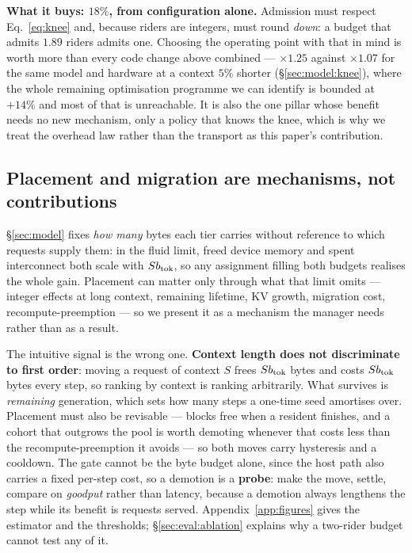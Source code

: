 \textbf{What it buys: $18\%$, from configuration alone.} Admission must respect
Eq.~\ref{eq:knee} and, because riders are integers, must round \emph{down}: a
budget that admits $1.89$ riders admits one. Choosing the operating point with that
in mind is worth more than every code change above combined --- $\times 1.25$
against $\times 1.07$ for the same model and hardware at a context $5\%$ shorter
(\S\ref{sec:model:knee}), where the whole remaining optimisation programme we can
identify is bounded at $+14\%$ and most of that is unreachable. It is also the one
pillar whose benefit needs no new mechanism, only a policy that knows the knee,
which is why we treat the overhead law rather than the transport as this paper's
contribution.

\subsection{Placement and migration are mechanisms, not contributions}
\label{sec:design:placement}

\S\ref{sec:model} fixes \emph{how many} bytes each tier carries without reference
to which requests supply them: in the fluid limit, freed device memory and spent
interconnect both scale with $Sb_{\mathrm{tok}}$, so any assignment filling both budgets
realises the whole gain. Placement can matter only through what that limit omits
--- integer effects at long context, remaining lifetime, KV growth, migration
cost, recompute-preemption --- so we present it as a mechanism the manager needs
rather than as a result.

The intuitive signal is the wrong one. \textbf{Context length does not discriminate
to first order}: moving a request of context $S$ frees $Sb_{\mathrm{tok}}$ bytes and costs
$Sb_{\mathrm{tok}}$ bytes every step, so ranking by context is ranking arbitrarily. What
survives is \emph{remaining} generation, which sets how many steps a one-time seed
amortises over. Placement must also be revisable --- blocks free when a resident
finishes, and a cohort that outgrows the pool is worth demoting whenever that costs
less than the recompute-preemption it avoids --- so both moves carry hysteresis and a
cooldown. The gate cannot be the byte budget alone, since the host path also carries
a fixed per-step cost, so a demotion is a \textbf{probe}: make the move, settle,
compare on \emph{goodput} rather than latency, because a demotion always lengthens
the step while its benefit is requests served. Appendix~\ref{app:figures} gives the
estimator and the thresholds; \S\ref{sec:eval:ablation} explains why a two-rider
budget cannot test any of it.
\label{sec:design:migration}
